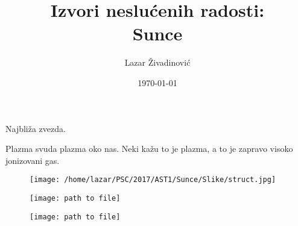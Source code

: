 \documentclass{beamer}
\title{Izvori neslućenih radosti:\\ Sunce}
\author[L. Živadinović]{Lazar Živadinović}
\institute[UBG]{Univerzitet u Beogradu}
\date{\today}
\begin{document}
\begin{frame}
  \titlepage
\end{frame}



\begin{frame}{}

\begin{block}{}
Najbliža zvezda.

\end{block}
\begin{block}{}
Plazma svuda plazma oko nas. Neki kažu to je plazma, a to je zapravo visoko jonizovani gas.

\end{block}

\end{frame}



\begin{frame}{}

\begin{figure}[!ht]
 \centering
  \texttt{[image: /home/lazar/PSC/2017/AST1/Sunce/Slike/struct.jpg]}
\end{figure}

\end{frame}


\begin{frame}{}

\begin{figure}[ht]
        \begin{minipage}[b]{0.45\linewidth}
            \centering
            \texttt{[image: path to file]}
        \end{minipage}
        \hspace{0.5cm}
        \begin{minipage}[b]{0.45\linewidth}
            \centering
            \texttt{[image: path to file]}
        \end{minipage}
    \end{figure}
   

\end{frame}
\end{document}
